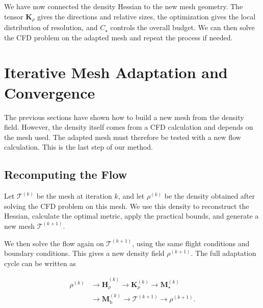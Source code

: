 \documentclass[11pt,a4paper]{article}
\begin{document}
\noindent We have now connected the density Hessian to the
new mesh geometry. The tensor $\mathbf K_\rho$ gives the
directions and relative sizes, the optimization gives the
local distribution of resolution, and $C_\star$ controls
the overall budget. We can then solve the CFD problem on
the adapted mesh and repeat the process if needed.




























\section{Iterative Mesh Adaptation and Convergence}
\label{sec:iterative_adaptation}

\noindent The previous sections have shown how to build a new
mesh from the density field. However, the density itself
comes from a CFD calculation and depends on the mesh used.
The adapted mesh must therefore be tested with a new flow
calculation. This is the last step of our method.

\subsection{Recomputing the Flow}

\noindent Let $\mathcal T^{(k)}$ be the mesh at iteration $k$,
and let $\rho^{(k)}$ be the density obtained after solving
the CFD problem on this mesh. We use this density to
reconstruct the Hessian, calculate the optimal metric,
apply the practical bounds, and generate a new mesh
$\mathcal T^{(k+1)}$.

\noindent We then solve the flow again on $\mathcal T^{(k+1)}$,
using the same flight conditions and boundary conditions.
This gives a new density field $\rho^{(k+1)}$. The full
adaptation cycle can be written as

\begin{equation}
    \label{eq:mesh_adaptation_cycle}
    \begin{aligned}
    \rho^{(k)}
    &\longrightarrow\widehat{\mathbf H}^{(k)}_\rho
    \longrightarrow\mathbf K_\rho^{(k)}
    \longrightarrow\mathbf M_\star^{(k)}\\
    &\longrightarrow\mathbf M_{\mathrm b}^{(k)}
    \longrightarrow\mathcal T^{(k+1)}
    \longrightarrow\rho^{(k+1)}.
    \end{aligned}
\end{equation}
\end{document}
